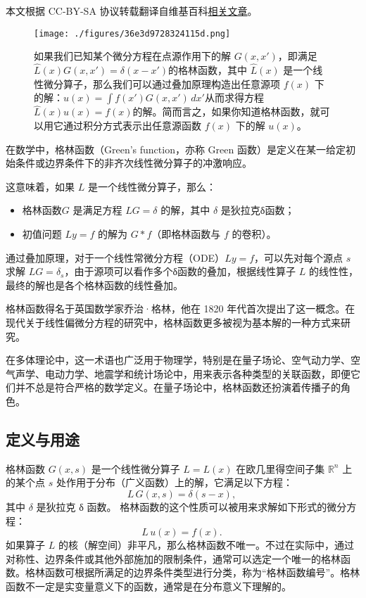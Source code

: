 
本文根据 CC-BY-SA 协议转载翻译自维基百科\href{https://en.wikipedia.org/wiki/Green\%27s_function}{相关文章}。

\begin{figure}[ht]
\centering
\texttt{[image: ./figures/36e3d9728324115d.png]}
\caption{如果我们已知某个微分方程在点源作用下的解 $G(x, x')$，即满足$\hat{L}(x)G(x,x') = \delta(x - x')$的格林函数，其中 $\hat{L}(x)$ 是一个线性微分算子，那么我们可以通过叠加原理构造出任意源项 $f(x)$ 下的解：$u(x) = \int f(x') G(x, x')\, dx'$从而求得方程$\hat{L}(x) u(x) = f(x)$的解。简而言之，如果你知道格林函数，就可以用它通过积分方式表示出任意源函数 $f(x)$ 下的解 $u(x)$。} \label{fig_GLhs_1}
\end{figure}
在数学中，格林函数（Green's function，亦称 Green 函数）是定义在某一给定初始条件或边界条件下的非齐次线性微分算子的冲激响应。

这意味着，如果 $L$ 是一个线性微分算子，那么：
\begin{itemize}
\item 格林函数$G$ 是满足方程 $LG = \delta$ 的解，其中 $\delta$ 是狄拉克δ函数；
\item 初值问题 $Ly = f$ 的解为 $G * f$（即格林函数与 $f$ 的卷积）。
\end{itemize}
通过叠加原理，对于一个线性常微分方程（ODE）$Ly = f$，可以先对每个源点 $s$ 求解 $LG = \delta_s$，由于源项可以看作多个δ函数的叠加，根据线性算子 $L$ 的线性性，最终的解也是各个格林函数的线性叠加。

格林函数得名于英国数学家乔治·格林，他在 1820 年代首次提出了这一概念。在现代关于线性偏微分方程的研究中，格林函数更多被视为基本解的一种方式来研究。

在多体理论中，这一术语也广泛用于物理学，特别是在量子场论、空气动力学、空气声学、电动力学、地震学和统计场论中，用来表示各种类型的关联函数，即便它们并不总是符合严格的数学定义。在量子场论中，格林函数还扮演着传播子的角色。
\subsection{定义与用途}
格林函数 $G(x, s)$ 是一个线性微分算子 $L = L(x)$ 在欧几里得空间子集 $\mathbb{R}^n$ 上的某个点 $s$ 处作用于分布（广义函数）上的解，它满足以下方程：
$$
L\,G(x,s) = \delta(s - x),~
$$
其中 $\delta$ 是狄拉克 δ 函数。
格林函数的这个性质可以被用来求解如下形式的微分方程：
$$
L\,u(x) = f(x).~
$$
如果算子 $L$ 的核（解空间）非平凡，那么格林函数不唯一。不过在实际中，通过对称性、边界条件或其他外部施加的限制条件，通常可以选定一个唯一的格林函数。格林函数可根据所满足的边界条件类型进行分类，称为“格林函数编号”。格林函数不一定是实变量意义下的函数，通常是在分布意义下理解的。

